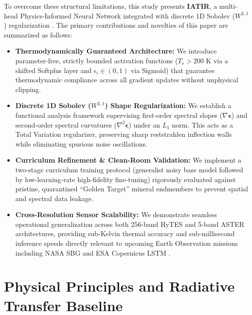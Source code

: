 \documentclass[journal]{IEEEtran}
\begin{document}
To overcome these structural limitations, this study presents \textbf{IATIR}, a multi-head Physics-Informed Neural Network integrated with discrete 1D Sobolev ($W^{2,1}$) regularization \cite{czarnecki2017sobolev, son2021sobolev}. The primary contributions and novelties of this paper are summarized as follows:
\begin{itemize}
    \item \textbf{Thermodynamically Guaranteed Architecture:} We introduce parameter-free, strictly bounded activation functions ($T_s > 200\text{ K}$ via a shifted Softplus layer and $\epsilon_i \in (0, 1)$ via Sigmoid) that guarantee thermodynamic compliance across all gradient updates without unphysical clipping.
    \item \textbf{Discrete 1D Sobolev ($W^{2,1}$) Shape Regularization:} We establish a functional analysis framework supervising first-order spectral slopes ($\nabla \bm{\epsilon}$) and second-order spectral curvatures ($\nabla^2 \bm{\epsilon}$) under an $L_1$ norm. This acts as a Total Variation regularizer, preserving sharp reststrahlen inflection walls while eliminating spurious noise oscillations.
    \item \textbf{Curriculum Refinement \& Clean-Room Validation:} We implement a two-stage curriculum training protocol (generalist noisy base model followed by low-learning-rate high-fidelity fine-tuning) rigorously evaluated against pristine, quarantined ``Golden Target'' mineral endmembers to prevent spatial and spectral data leakage.
    \item \textbf{Cross-Resolution Sensor Scalability:} We demonstrate seamless operational generalization across both 256-band HyTES and 5-band ASTER architectures, providing sub-Kelvin thermal accuracy and sub-millisecond inference speeds directly relevant to upcoming Earth Observation missions including NASA SBG \cite{cawsenicholson2021nasa} and ESA Copernicus LSTM \cite{koetz2018high}.
\end{itemize}

\section{Physical Principles and Radiative Transfer Baseline}
\end{document}
